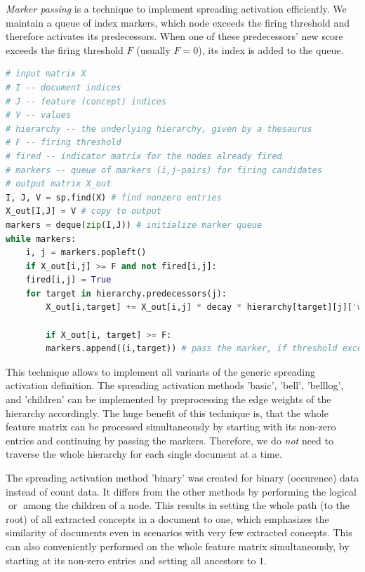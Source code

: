 \documentclass{article}
\begin{document}
\emph{Marker passing} is a technique to implement spreading activation efficiently.
We maintain a queue of index markers, which node exceeds the firing threshold and therefore
activates its predecessors.
When one of these predecessors' new score exceeds the firing threshold $F$ (usually $F=0$),
its index is added to the queue.

\begin{lstlisting}[language=python]
# input matrix X
# I -- document indices
# J -- feature (concept) indices
# V -- values
# hierarchy -- the underlying hierarchy, given by a thesaurus
# F -- firing threshold
# fired -- indicator matrix for the nodes already fired
# markers -- queue of markers (i,j-pairs) for firing candidates
# output matrix X_out
I, J, V = sp.find(X) # find nonzero entries
X_out[I,J] = V # copy to output
markers = deque(zip(I,J)) # initialize marker queue
while markers:
    i, j = markers.popleft()
    if X_out[i,j] >= F and not fired[i,j]:
	fired[i,j] = True
	for target in hierarchy.predecessors(j):
	    X_out[i,target] += X_out[i,j] * decay * hierarchy[target][j]['weight'] # activate

	    if X_out[i, target] >= F:
		markers.append((i,target)) # pass the marker, if threshold exceeded

\end{lstlisting}
This technique allows to implement all variants of the generic spreading activation definition.
The spreading activation methods 'basic', 'bell', 'belllog', and 'children' can be implemented by
preprocessing the edge weights of the hierarchy accordingly.
The huge benefit of this technique is, that the whole feature matrix can be processed simultaneously
by starting with its non-zero entries and continuing by passing the markers.
Therefore, we do \emph{not} need to traverse the whole hierarchy for each single document at a time.

The spreading activation method 'binary' was created for binary (occurence) data instead of count data.
It differs from the other methods by performing the logical $\operatorname{or}$ among the children of a node.
This results in setting the whole path (to the root) of all extracted concepts in a document to one,
which emphasizes the similarity of documents even in scenarios with very few extracted concepts.
This can also conveniently performed on the whole feature matrix simultaneously,
by starting at its non-zero entries and setting all ancestors to $1$.
\end{document}
